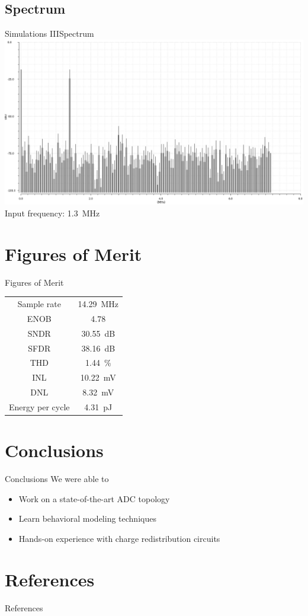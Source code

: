 \documentclass{beamer}
\begin{document}
 \subsection{Spectrum}
 \begin{frame}{Simulations III}{Spectrum}
  \centering
  \includegraphics[width=\textwidth]{img/fft}
  Input frequency: \SI{1.3}{\MHz}
 \end{frame}
 \AtBeginSection[]{}
 
 \section{Figures of Merit}
 \begin{frame}{Figures of Merit}
  \centering
  \begin{tabular}[]{cc}
   \toprule
   Sample rate & \SI{14.29}{\MHz}\\
   ENOB & \num{4.78}\\
   SNDR & \SI{30.55}{dB}\\
   SFDR & \SI{38.16}{dB}\\
   THD & \SI{1.44}{\percent}\\
   INL & \alert{\SI{10.22}{\mV}}\\
   DNL & \alert{\SI{8.32}{\mV}}\\
   Energy per cycle & \SI{4.31}{\pico\joule}\\\bottomrule
  \end{tabular}
 \end{frame}
 \section{Conclusions}
 \begin{frame}{Conclusions}
  We were able to
  \begin{itemize}
   \item Work on a state-of-the-art ADC topology
   \item<2-> Learn behavioral modeling techniques
   \item<3-> Hands-on experience with charge redistribution circuits
  \end{itemize}
 \end{frame}

 \section{References}
 \begin{frame}{References}
  \nocite{*}
  
  
 \end{frame}
\end{document}
